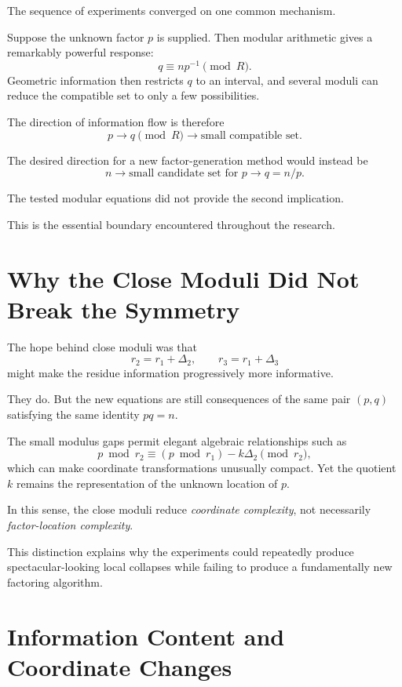 \documentclass[11pt,a4paper]{article}
\begin{document}
The sequence of experiments converged on one common mechanism.

Suppose the unknown factor $p$ is supplied. Then modular arithmetic gives a remarkably powerful response:
\[
    q\equiv np^{-1}\pmod R.
\]
Geometric information then restricts $q$ to an interval, and several moduli can reduce the compatible set to only a few possibilities.

The direction of information flow is therefore
\[
    p
    \longrightarrow
    q \pmod R
    \longrightarrow
    \text{small compatible set}.
\]

The desired direction for a new factor-generation method would instead be
\[
    n
    \longrightarrow
    \text{small candidate set for }p
    \longrightarrow
    q=n/p.
\]

The tested modular equations did not provide the second implication.

This is the essential boundary encountered throughout the research.

\section{Why the Close Moduli Did Not Break the Symmetry}

The hope behind close moduli was that
\[
    r_2=r_1+\Delta_2,
    \qquad
    r_3=r_1+\Delta_3
\]
might make the residue information progressively more informative.

They do. But the new equations are still consequences of the same pair $(p,q)$ satisfying the same identity $pq=n$.

The small modulus gaps permit elegant algebraic relationships such as
\[
    p\bmod r_2
    \equiv
    (p\bmod r_1)-k\Delta_2
    \pmod{r_2},
\]
which can make coordinate transformations unusually compact. Yet the quotient $k$ remains the representation of the unknown location of $p$.

In this sense, the close moduli reduce \emph{coordinate complexity}, not necessarily \emph{factor-location complexity}.

This distinction explains why the experiments could repeatedly produce spectacular-looking local collapses while failing to produce a fundamentally new factoring algorithm.

\section{Information Content and Coordinate Changes}
\end{document}
